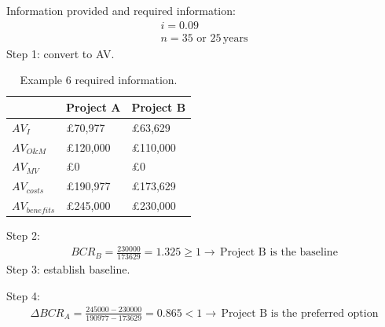 Information provided and required information:
\begin{gather}
  i = 0.09\\
  n = 35 \textrm{ or } 25\, \textrm{years}
\end{gather}
Step 1: convert to AV.
\begin{table}[H]
  \centering
  \begin{tabular}{@{}lll@{}}
    \toprule
                    & Project A       & Project B       \\
    \midrule
    $AV_I$          & \pounds 70,977  & \pounds 63,629  \\
    $AV_{O\&M}$     & \pounds 120,000 & \pounds 110,000 \\
    $AV_{MV}$       & \pounds 0       & \pounds 0       \\
    $AV_{costs}$    & \pounds 190,977 & \pounds 173,629 \\
    $AV_{benefits}$ & \pounds 245,000 & \pounds 230,000 \\
    \bottomrule
  \end{tabular}
  \caption{Example 6 required information.}
\end{table}
Step 2:
\begin{gather}
  BCR_B = \frac{230000}{173629} = 1.325 \geq 1 \rightarrow \, \textrm{Project B is the baseline}
\end{gather}
Step 3: establish baseline.

Step 4:
\begin{gather}
  \Delta BCR_A = \frac{245000 - 230000}{190977-173629}=0.865<1\rightarrow\,\textrm{Project B is the preferred option}
\end{gather}